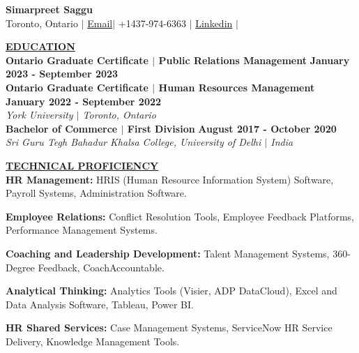 \documentclass{article}
\begin{document}
\begin{center}
\thispagestyle{empty}
\large \textbf{Simarpreet Saggu \\}
\normalsize Toronto, Ontario $\mid$ {\href{mailto:saggusimarpreet3@gmail.com}{Email}}$\mid$ +1437-974-6363 $\mid$ \href{https://www.linkedin.com/in/simarpreetsaggu/}{Linkedin} $\mid$ \href{}{}   \\
\hrulefill
\end{center}


\noindent \textbf{\underline{EDUCATION}} \\
\textbf{Ontario Graduate Certificate $\mid$ Public Relations Management} \hfill \textbf{January 2023 - September 2023} \\
\textbf{Ontario Graduate Certificate $\mid$ Human Resources Management} \hfill \textbf{January 2022 -  September 2022} \\
\textit{York University $\mid$ Toronto, Ontario}\\ 


\noindent\textbf{Bachelor of Commerce $\mid$ First Division} \hfill \textbf{August 2017 -   October 2020} \\
\textit{Sri Guru Tegh Bahadur Khalsa College, University of Delhi $\mid$ India} 
\vspace{2mm}

\noindent \textbf{\underline{TECHNICAL PROFICIENCY}} \\
\noindent\textbf{HR Management:} HRIS (Human Resource Information System) Software, Payroll Systems, Administration Software.

\noindent\textbf{Employee Relations:} Conflict Resolution Tools, Employee Feedback Platforms, Performance Management Systems.

\noindent\textbf{Coaching and Leadership Development:} Talent Management Systems, 360-Degree Feedback, CoachAccountable.

\noindent\textbf{Analytical Thinking:} Analytics Tools (Visier, ADP DataCloud), Excel and Data Analysis Software, Tableau, Power BI.

\noindent\textbf{HR Shared Services:} Case Management Systems, ServiceNow HR Service Delivery, Knowledge Management Tools.
\end{document}
